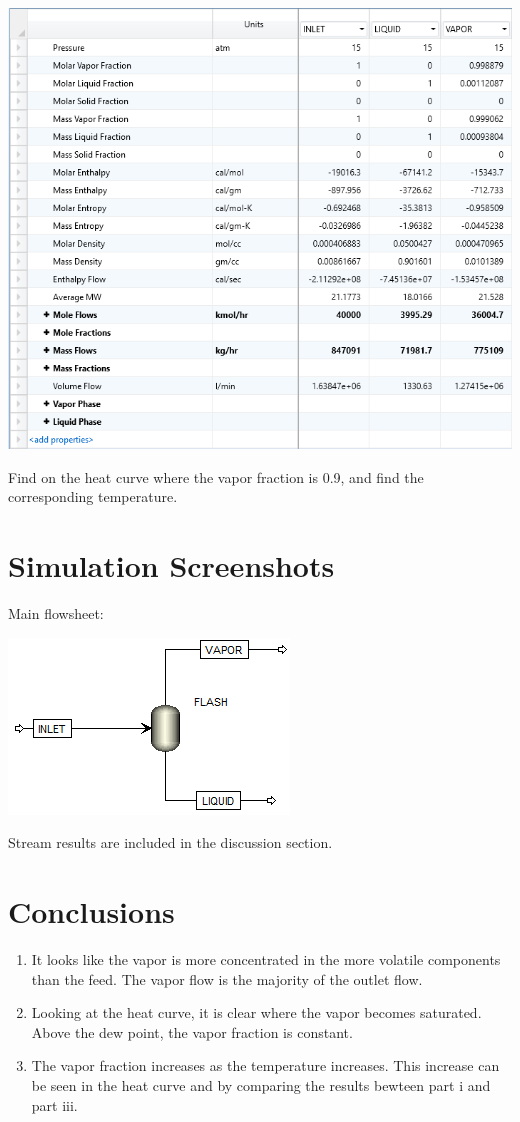 \documentclass[12pt]{article}
\begin{document}
\begin{enumerate}
    \includegraphics[scale=0.8]{partiii.png}

    Find on the heat curve where the vapor fraction is 0.9, and find the corresponding temperature.

\end{enumerate}

\section{Simulation Screenshots}

Main flowsheet:

\includegraphics{flowsheet.png}

Stream results are included in the discussion section. 


\section{Conclusions}

\begin{enumerate}
    \item It looks like the vapor is more concentrated in the more volatile components than the feed. The vapor flow is the majority of the outlet flow.

    \item Looking at the heat curve, it is clear where the vapor becomes saturated. Above the dew point, the vapor fraction is constant.

    \item The vapor fraction increases as the temperature increases. This increase can be seen in the heat curve and by comparing the results bewteen part i and part iii.
\end{enumerate}
\end{document}
